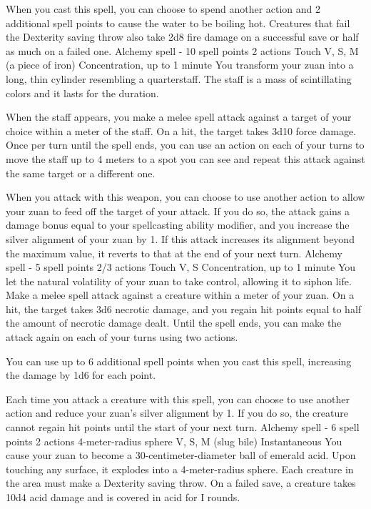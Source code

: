     When you cast this spell, you can choose to spend another action and 2 additional spell points to cause the water to be boiling hot.
    Creatures that fail the Dexterity saving throw also take 2d8 fire damage on a successful save or half as much on a failed one.
    {Alchemy spell - 10 spell points}
    {2 actions}
    {Touch}
    {V, S, M (a piece of iron)}
    {Concentration, up to 1 minute}
    You transform your zuan into a long, thin cylinder resembling a quarterstaff.
    The staff is a mass of scintillating colors and it lasts for the duration.

    When the staff appears, you make a melee spell attack against a target of your choice within a meter of the staff.
    On a hit, the target takes 3d10 force damage.
    Once per turn until the spell ends, you can use an action on each of your turns to move the staff up to 4 meters to a spot you can see and repeat this attack against the same target or a different one.

    When you attack with this weapon, you can choose to use another action to allow your zuan to feed off the target of your attack.
    If you do so, the attack gains a damage bonus equal to your spellcasting ability modifier, and you increase the silver alignment of your zuan by 1.
    If this attack increases its alignment beyond the maximum value, it reverts to that at the end of your next turn.
    {Alchemy spell - 5 spell points}
    {2/3 actions}
    {Touch}
    {V, S}
    {Concentration, up to 1 minute}
    You let the natural volatility of your zuan to take control, allowing it to siphon life.
    Make a melee spell attack against a creature within a meter of your zuan.
    On a hit, the target takes 3d6 necrotic damage, and you regain hit points equal to half the amount of necrotic damage dealt.
    Until the spell ends, you can make the attack again on each of your turns using two actions.

    You can use up to 6 additional spell points when you cast this spell, increasing the damage by 1d6 for each point.

    Each time you attack a creature with this spell, you can choose to use another action and reduce your zuan's silver alignment by 1.
    If you do so, the creature cannot regain hit points until the start of your next turn.
    {Alchemy spell - 6 spell points}
    {2 actions}
    {4-meter-radius sphere}
    {V, S, M (slug bile)}
    {Instantaneous}
    You cause your zuan to become a 30-centimeter-diameter ball of emerald acid.
    Upon touching any surface, it explodes into a 4-meter-radius sphere.
    Each creature in the area must make a Dexterity saving throw.
    On a failed save, a creature takes 10d4 acid damage and is covered in acid for I rounds.

